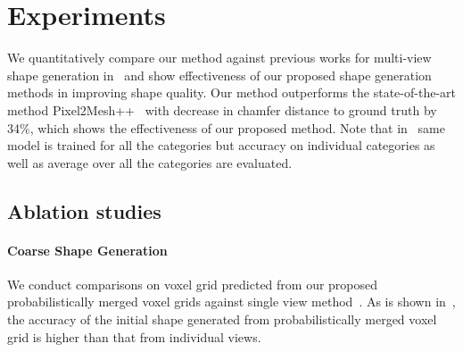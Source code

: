 \section{Experiments}

We quantitatively compare our method against previous works for multi-view shape generation in~ and show effectiveness of our proposed shape generation methods in improving shape quality. Our method outperforms the state-of-the-art method  Pixel2Mesh++~\cite{wen2019pixel2mesh++} with
decrease in chamfer distance to ground truth by 34\%, which shows the effectiveness of our proposed method.
Note that in~ same model is trained for all the categories but accuracy on individual categories as well as average over all the categories are evaluated.



\subsection{Ablation studies}

\vspace{-2mm}
\paragraph{Coarse Shape Generation}
We conduct comparisons on voxel grid predicted from our proposed probabilistically merged voxel grids against single view method~\cite{gkioxari2019meshrcnn}.
As is shown in~, the accuracy of the initial shape generated from probabilistically merged voxel grid is higher than that from individual views.


\vspace{-2mm}
